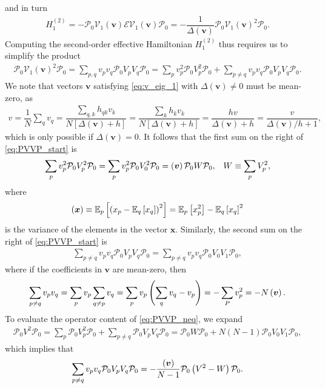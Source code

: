 \documentclass[nofootinbib,notitlepage,11pt]{revtex4-2}
\newcommand{\f}[2]{\dfrac{#1}{#2}} %
\newcommand{\p}[1]{\left(#1\right)} %
\renewcommand{\sp}[1]{\left[#1\right]} %
\renewcommand{\v}{\bm} %
\newcommand{\1}{\mathds{1}}
\newcommand{\E}{\mathcal{E}}
\renewcommand{\P}{\mathcal{P}}
\newcommand{\V}{\mathcal{V}}
\newcommand{\EE}{\mathbb{E}}
\let\var\relax
\DeclareMathOperator{\var}{var}
\begin{document}
and in turn
\begin{align}
  H_1^{(2)}
  = -\P_0 \V_1\p{\v v} \E \V_1\p{\v v} \P_0
  = -\f1{\Delta\p{\v v}} \P_0 \V_1\p{\v v}^2 \P_0.
\end{align}
Computing the second-order effective Hamiltonian $H_1^{(2)}$ thus
requires us to simplify the product
\begin{align}
  \P_0 \V_1\p{\v v}^2 \P_0
  = \sum_{p,q} v_p v_q \P_0 V_p V_q \P_0
  = \sum_p v_p^2 \P_0 V_p^2 \P_0
  + \sum_{p\ne q} v_p v_q \P_0 V_p V_q \P_0.
  \label{eq:PVVP_start}
\end{align}
We note that vectors $\v v$ satisfying \eqref{eq:v_eig_1} with
$\Delta\p{\v v}\ne 0$ must be mean-zero, as
\begin{align}
  v = \f1N \sum_q v_q
  = \f{\sum_{q,k} h_{qk} v_k}{N\sp{\Delta\p{\v v}+h}}
  = \f{\sum_k h_k v_k}{N\sp{\Delta\p{\v v}+h}}
  = \f{h v}{\Delta\p{\v v}+h}
  = \f{v}{\Delta\p{\v v}/h+1},
\end{align}
which is only possible if $\Delta\p{\v v}=0$.  It follows that the
first sum on the right of \eqref{eq:PVVP_start} is
\begin{align}
  \sum_p v_p^2 \P_0 V_p^2 \P_0
  = \sum_p v_p^2 \P_0 V_0^2 \P_0
  = \var\p{\v v} \P_0 W \P_0,
  &&
  W \equiv \sum_p V_p^2,
\end{align}
where
\begin{align}
  \var\p{\v x} \equiv \EE_p\sp{\p{x_p-\EE_q\sp{x_q}}^2}
  = \EE_p\sp{x_p^2} - \EE_q\sp{x_q}^2
\end{align}
is the variance of the elements in the vector $\v x$.  Similarly, the
second sum on the right of \eqref{eq:PVVP_start} is
\begin{align}
  \sum_{p\ne q} v_p v_q \P_0 V_p V_q \P_0
  = \sum_{p\ne q} v_p v_q \P_0 V_0 V_1 \P_0,
  \label{eq:PVVP_neq_start}
\end{align}
where if the coefficients in $\v v$ are mean-zero, then
\begin{align}
  \sum_{p\ne q} v_p v_q
  = \sum_p v_p \sum_{q\ne p} v_q
  = \sum_p v_p \p{\sum_q v_q - v_p}
  = - \sum_P v_p^2
  = - N \var\p{\v v}.
\end{align}
To evaluate the operator content of \eqref{eq:PVVP_neq}, we expand
\begin{align}
  \P_0 V^2 \P_0
  = \sum_p \P_0 V_p^2 \P_0
  + \sum_{p\ne q} \P_0 V_p V_q \P_0
  = \P_0 W \P_0 + N \p{N-1} \P_0 V_0 V_1 \P_0,
\end{align}
which implies that
\begin{align}
  \sum_{p\ne q} v_p v_q \P_0 V_p V_q \P_0
  = -\f{\var\p{\v v}}{N-1}\P_0\p{V^2 - W} \P_0.
  \label{eq:PVVP_neq}
\end{align}
\end{document}
